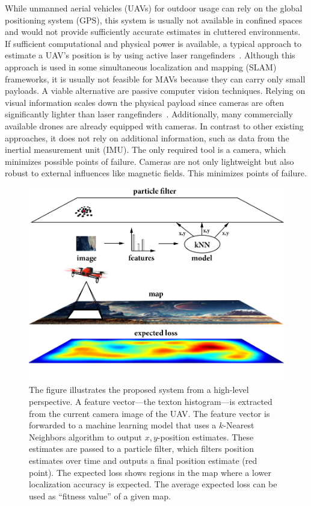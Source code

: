 \documentclass[11pt]{report}
\begin{document}
While unmanned aerial vehicles (UAVs) for outdoor usage can rely on
the global positioning system (GPS), this system is usually not
available in confined spaces and would not provide sufficiently
accurate estimates in cluttered environments. If sufficient
computational and physical power is available, a typical approach to
estimate a UAV's position is by using active laser
rangefinders~\cite{grzonka2009towards,bachrach2009autonomous}.
Although this approach is used in some simultaneous localization and
mapping (SLAM) frameworks, it is usually not feasible for MAVs because
they can carry only small payloads. A viable alternative are passive
computer vision techniques. Relying on visual information scales down
the physical payload since cameras are often significantly lighter
than laser
rangefinders~\cite{blosch2010vision,angeli20062d,ahrens2009vision}.
Additionally, many commercially available drones are already equipped
with cameras.  In contrast to other existing approaches, it does not
rely on additional information, such as data from the inertial
measurement unit (IMU). The only required tool is a camera, which
minimizes possible points of failure. Cameras are not only lightweight
but also robust to external influences like magnetic fields. This
minimizes points of failure.
\begin{figure}[h!]
\begin{center}
\includegraphics[width=0.75\columnwidth]{nutshell}
\caption{{\label{fig:highleveloverview} The figure illustrates the
    proposed system from a high-level perspective. A feature
    vector---the texton histogram---is extracted from the current
    camera image of the UAV. The feature vector is forwarded to a
    machine learning model that uses a $k$-Nearest Neighbors algorithm
    to output $x,y$-position estimates. These estimates are passed to
    a particle filter, which filters position estimates over time and
    outputs a final position estimate (red point). The expected loss
    shows regions in the map where a lower localization accuracy is
    expected. The average expected loss can be used as ``fitness
    value'' of a given map.%
  }}
\end{center}
\end{figure}
\end{document}
